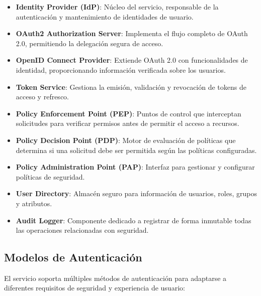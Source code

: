 \documentclass[12pt,a4paper]{article}
\begin{document}
\begin{itemize}
    \item \textbf{Identity Provider (IdP)}: Núcleo del servicio, responsable de la autenticación y mantenimiento de identidades de usuario.
    
    \item \textbf{OAuth2 Authorization Server}: Implementa el flujo completo de OAuth 2.0, permitiendo la delegación segura de acceso.
    
    \item \textbf{OpenID Connect Provider}: Extiende OAuth 2.0 con funcionalidades de identidad, proporcionando información verificada sobre los usuarios.
    
    \item \textbf{Token Service}: Gestiona la emisión, validación y revocación de tokens de acceso y refresco.
    
    \item \textbf{Policy Enforcement Point (PEP)}: Puntos de control que interceptan solicitudes para verificar permisos antes de permitir el acceso a recursos.
    
    \item \textbf{Policy Decision Point (PDP)}: Motor de evaluación de políticas que determina si una solicitud debe ser permitida según las políticas configuradas.
    
    \item \textbf{Policy Administration Point (PAP)}: Interfaz para gestionar y configurar políticas de seguridad.
    
    \item \textbf{User Directory}: Almacén seguro para información de usuarios, roles, grupos y atributos.
    
    \item \textbf{Audit Logger}: Componente dedicado a registrar de forma inmutable todas las operaciones relacionadas con seguridad.
\end{itemize}

\subsection{Modelos de Autenticación}
\label{subsec:as-autenticacion}

El servicio soporta múltiples métodos de autenticación para adaptarse a diferentes requisitos de seguridad y experiencia de usuario:
\end{document}
